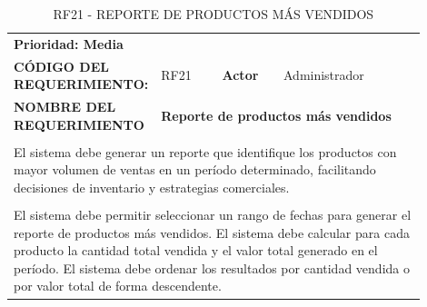 \begingroup
\renewcommand{\arraystretch}{1.3}
\setlength{\tabcolsep}{6pt}
\centering
\begin{longtable}{|p{0.25\linewidth}|p{0.15\linewidth}|p{0.15\linewidth}|p{0.35\linewidth}|}
\caption{RF21 - REPORTE DE PRODUCTOS MÁS VENDIDOS}\label{tab:rf21}\\
\hline
		\rowcolor{tableheaderblue}
		\multicolumn{4}{|l|}{\textbf{Requerimientos funcionales}}                                                                                                                                 \\ \hline
		\multicolumn{4}{|l|}{\textbf{Prioridad: Media}}                                                                                                                                           \\ \hline
		\textbf{CÓDIGO DEL REQUERIMIENTO:}                          & RF21                                                            & \cellcolor{tableheaderblue}\textbf{Actor} & Administrador \\ \hline
		\textbf{NOMBRE DEL REQUERIMIENTO}                           & \multicolumn{3}{l|}{\textbf{Reporte de productos más vendidos}}                                                             \\ \hline
		\rowcolor{tableheaderblue}
		\multicolumn{4}{|l|}{\textbf{Descripción}}                                                                                                                                                \\ \hline
		\multicolumn{4}{|p{0.96\linewidth}|}{%
		El sistema debe generar un reporte que identifique los productos con mayor volumen de ventas en un período determinado, facilitando decisiones de inventario y estrategias comerciales.}  \\ \hline
		\rowcolor{tableheaderblue}
		\multicolumn{4}{|l|}{\textbf{Funcionalidad}}                                                                                                                                              \\ \hline
		\multicolumn{4}{|p{0.96\linewidth}|}{%
		El sistema debe permitir seleccionar un rango de fechas para generar el reporte de productos más vendidos. \newline
		El sistema debe calcular para cada producto la cantidad total vendida y el valor total generado en el período. \newline
		El sistema debe ordenar los resultados por cantidad vendida o por valor total de forma descendente. \newline
}
\end{longtable}

